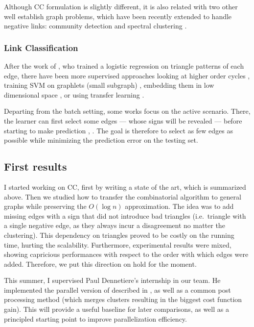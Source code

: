 Although CC formulation is slightly different, it is also related with two other
well establish graph problems, which have been recently extended to handle
negative links: community detection
\autocites{Yang2007}{Traag2009}{Amelio2013}{Chen14} and spectral clustering
\autocites{Luca10}{Gallier15}.

\subsubsection{Link Classification}\label{link-classification}

After the work of \textcite{Leskovec2010}, who trained a logistic regression on
triangle patterns of each edge, there have been more supervised approaches
looking at higher order cycles \autocite{LowRankCompletion14}, training SVM on
graphlets (small subgraph) \autocite{Papaoikonomou2014}, embedding them in low
dimensional space \autocite{Qian2014}, or using transfer learning
\autocite{SNTransfer13}.

Departing from the batch setting, some works focus on the active scenario.
There, the learner can first select some edges --- whose signs will be revealed
--- before starting to make prediction \autocite{Cesa-Bianchi2012a},
\autocite{Cesa-Bianchi2013}. The goal is therefore to select as few edges as
possible while minimizing the prediction error on the testing set.

\subsection{First results}\label{first-results}

I started working on CC, first by writing a state of the art, which is
summarized above. Then we studied how to transfer the combinatorial algorithm
\kwik{} to general graphs while preserving the $O(\log n)$ approximation. The
idea was to add missing edges with a sign that did not introduce bad triangles
(i.e.~triangle with a single negative edge, as they always incur a disagreement
no matter the clustering). This dependency on triangles proved to be costly on
the running time, hurting the scalability. Furthermore, experimental results
were mixed, showing capricious performances with respect to the order with
which edges were added. Therefore, we put this direction on hold for the
moment.

This summer, I supervised Paul Dennetiere's internship in our team. He
implemented the parallel version of \kwik{} described in \autocite{Pan2014}, as
well as a common post processing method (which merges clusters resulting in the
biggest cost function gain). This will provide a useful baseline for later
comparisons, as well as a principled starting point to improve parallelization
efficiency.

